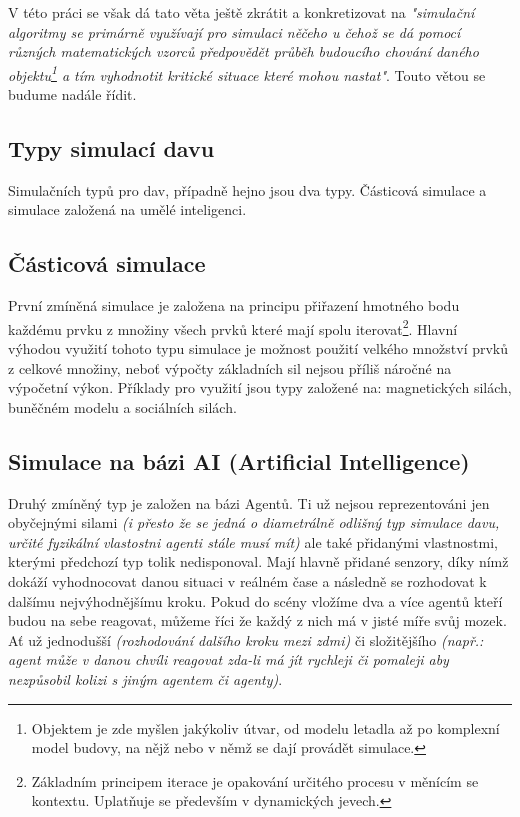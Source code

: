 \documentclass[czech,public,dept460,male,cpdeclaration]{diploma}
\begin{document}
V této práci se však dá tato věta ještě zkrátit a konkretizovat na \textit{"simulační algoritmy se primárně využívají pro simulaci něčeho u čehož se dá pomocí různých matematických vzorců předpovědět průběh budoucího chování daného objektu\footnote{Objektem je zde myšlen jakýkoliv útvar, od modelu letadla až po komplexní model budovy, na nějž nebo v němž se dají provádět simulace.} a tím vyhodnotit kritické situace které mohou nastat"}. Touto větou se budume nadále řídit.

\subsection{Typy simulací davu}
Simulačních typů pro dav, případně hejno jsou dva typy. Částicová simulace a simulace založená na umělé inteligenci. \cite{linkToBachelor1}

\subsection{Částicová simulace}
První zmíněná simulace je založena na principu přiřazení hmotného bodu každému prvku z množiny všech prvků které mají spolu iterovat\footnote{Základním principem iterace je opakování určitého procesu v měnícím se kontextu. Uplatňuje se především v dynamických jevech.\cite{linkToIteration}}. Hlavní výhodou využití tohoto typu simulace je možnost použití velkého množství prvků z celkové množiny, neboť výpočty základních sil nejsou příliš náročné na výpočetní výkon. Příklady pro využití jsou typy založené na: magnetických silách, buněčném modelu a sociálních silách. \cite{linkToBachelor1}

\subsection{Simulace na bázi AI (Artificial Intelligence)}\label{sec:simulace-na-bazi-ai-artificial-intelligence}
Druhý zmíněný typ je založen na bázi Agentů. Ti už nejsou reprezentováni jen obyčejnými silami \textit{(i přesto že se jedná o diametrálně odlišný typ simulace davu, určité fyzikální vlastostni agenti stále musí mít)} ale také přidanými vlastnostmi, kterými předchozí typ tolik nedisponoval. Mají hlavně přidané senzory, díky nímž dokáží vyhodnocovat danou situaci v reálném čase a následně se rozhodovat k dalšímu nejvýhodnějšímu kroku. Pokud do scény vložíme dva a více agentů kteří budou na sebe reagovat, můžeme říci že každý z nich má v jisté míře svůj mozek. Ať už jednodušší \textit{(rozhodování dalšího kroku mezi zdmi)} či složitějšího \textit{(např.: agent může v danou chvíli reagovat zda-li má jít rychleji či pomaleji aby nezpůsobil kolizi s jiným agentem či agenty)}.
\end{document}
